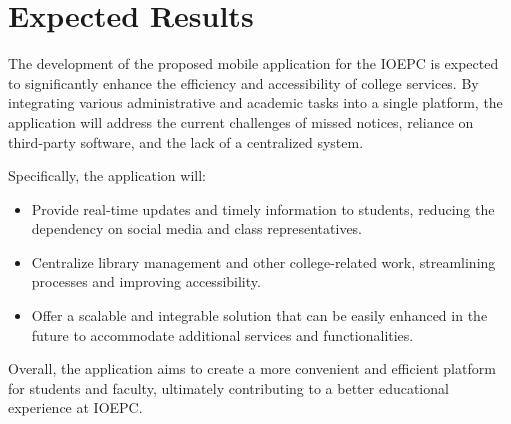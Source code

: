 \chapter{Expected Results}

The development of the proposed mobile application for the IOEPC is expected to significantly enhance the efficiency and accessibility of college services. By integrating various administrative and academic tasks into a single platform, the application will address the current challenges of missed notices, reliance on third-party software, and the lack of a centralized system. 

Specifically, the application will:
\begin{itemize}
    \item Provide real-time updates and timely information to students, reducing the dependency on social media and class representatives.
    \item Centralize library management and other college-related work, streamlining processes and improving accessibility.
    \item Offer a scalable and integrable solution that can be easily enhanced in the future to accommodate additional services and functionalities.
\end{itemize}

Overall, the application aims to create a more convenient and efficient platform for students and faculty, ultimately contributing to a better educational experience at IOEPC.